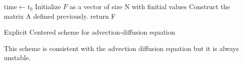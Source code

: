 \documentclass[11pt,a4paper]{article}
\begin{document}
\IncMargin{1em}
\begin{algorithm}[h]
	\BlankLine
	$\text{time} \leftarrow  t_0$ \;
	Initialize $F$ as a vector of size N with f{initial} values\;
	Construct the matrix A defined previously.
	\BlankLine
	\BlankLine
	return F
	
	
\caption{Explicit Centered scheme for advection-diffusion equation}\label{alg:explicit_center}
\end{algorithm}
\DecMargin{1em}

This scheme is consistent with the advection diffusion equation but it is always unstable.
\end{document}
